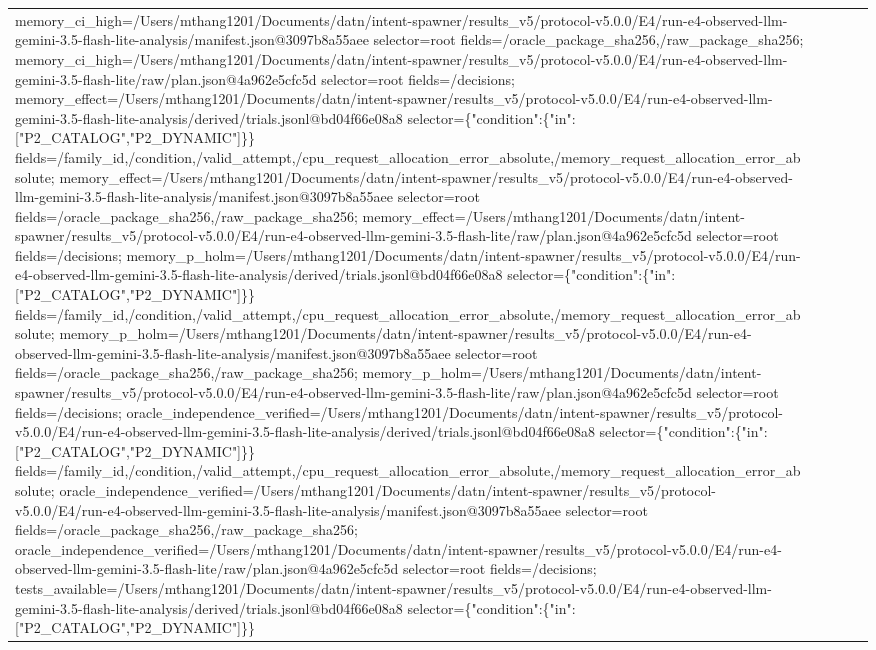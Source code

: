 \begin{tabular}{lllll}
memory\_ci\_high=/Users/mthang1201/Documents/datn/intent-spawner/results\_v5/protocol-v5.0.0/E4/run-e4-observed-llm-gemini-3.5-flash-lite-analysis/manifest.json@3097b8a55aee selector=root fields=/oracle\_package\_sha256,/raw\_package\_sha256; memory\_ci\_high=/Users/mthang1201/Documents/datn/intent-spawner/results\_v5/protocol-v5.0.0/E4/run-e4-observed-llm-gemini-3.5-flash-lite/raw/plan.json@4a962e5cfc5d selector=root fields=/decisions; memory\_effect=/Users/mthang1201/Documents/datn/intent-spawner/results\_v5/protocol-v5.0.0/E4/run-e4-observed-llm-gemini-3.5-flash-lite-analysis/derived/trials.jsonl@bd04f66e08a8 selector=\{"condition":\{"in":["P2\_CATALOG","P2\_DYNAMIC"]\}\} fields=/family\_id,/condition,/valid\_attempt,/cpu\_request\_allocation\_error\_absolute,/memory\_request\_allocation\_error\_absolute; memory\_effect=/Users/mthang1201/Documents/datn/intent-spawner/results\_v5/protocol-v5.0.0/E4/run-e4-observed-llm-gemini-3.5-flash-lite-analysis/manifest.json@3097b8a55aee selector=root fields=/oracle\_package\_sha256,/raw\_package\_sha256; memory\_effect=/Users/mthang1201/Documents/datn/intent-spawner/results\_v5/protocol-v5.0.0/E4/run-e4-observed-llm-gemini-3.5-flash-lite/raw/plan.json@4a962e5cfc5d selector=root fields=/decisions; memory\_p\_holm=/Users/mthang1201/Documents/datn/intent-spawner/results\_v5/protocol-v5.0.0/E4/run-e4-observed-llm-gemini-3.5-flash-lite-analysis/derived/trials.jsonl@bd04f66e08a8 selector=\{"condition":\{"in":["P2\_CATALOG","P2\_DYNAMIC"]\}\} fields=/family\_id,/condition,/valid\_attempt,/cpu\_request\_allocation\_error\_absolute,/memory\_request\_allocation\_error\_absolute; memory\_p\_holm=/Users/mthang1201/Documents/datn/intent-spawner/results\_v5/protocol-v5.0.0/E4/run-e4-observed-llm-gemini-3.5-flash-lite-analysis/manifest.json@3097b8a55aee selector=root fields=/oracle\_package\_sha256,/raw\_package\_sha256; memory\_p\_holm=/Users/mthang1201/Documents/datn/intent-spawner/results\_v5/protocol-v5.0.0/E4/run-e4-observed-llm-gemini-3.5-flash-lite/raw/plan.json@4a962e5cfc5d selector=root fields=/decisions; oracle\_independence\_verified=/Users/mthang1201/Documents/datn/intent-spawner/results\_v5/protocol-v5.0.0/E4/run-e4-observed-llm-gemini-3.5-flash-lite-analysis/derived/trials.jsonl@bd04f66e08a8 selector=\{"condition":\{"in":["P2\_CATALOG","P2\_DYNAMIC"]\}\} fields=/family\_id,/condition,/valid\_attempt,/cpu\_request\_allocation\_error\_absolute,/memory\_request\_allocation\_error\_absolute; oracle\_independence\_verified=/Users/mthang1201/Documents/datn/intent-spawner/results\_v5/protocol-v5.0.0/E4/run-e4-observed-llm-gemini-3.5-flash-lite-analysis/manifest.json@3097b8a55aee selector=root fields=/oracle\_package\_sha256,/raw\_package\_sha256; oracle\_independence\_verified=/Users/mthang1201/Documents/datn/intent-spawner/results\_v5/protocol-v5.0.0/E4/run-e4-observed-llm-gemini-3.5-flash-lite/raw/plan.json@4a962e5cfc5d selector=root fields=/decisions; tests\_available=/Users/mthang1201/Documents/datn/intent-spawner/results\_v5/protocol-v5.0.0/E4/run-e4-observed-llm-gemini-3.5-flash-lite-analysis/derived/trials.jsonl@bd04f66e08a8 selector=\{"condition":\{"in":["P2\_CATALOG","P2\_DYNAMIC"]\}\} 
\end{tabular}

